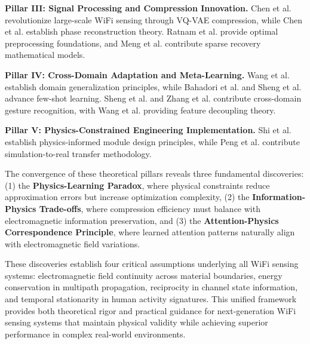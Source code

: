 \documentclass[journal]{IEEEtran}
\begin{document}
\textbf{Pillar III: Signal Processing and Compression Innovation.} Chen et al. \cite{chen2024efficientfi} revolutionize large-scale WiFi sensing through VQ-VAE compression, while Chen et al. \cite{chen2024wiphase} establish phase reconstruction theory. Ratnam et al. \cite{ratnam2024optimal} provide optimal preprocessing foundations, and Meng et al. \cite{meng2021wihgr} contribute sparse recovery mathematical models.

\textbf{Pillar IV: Cross-Domain Adaptation and Meta-Learning.} Wang et al. \cite{wang2022airfi} establish domain generalization principles, while Bahadori et al. \cite{bahadori2022rewis} and Sheng et al. \cite{sheng2024metaformer} advance few-shot learning. Sheng et al. \cite{sheng2024cdfi} and Zhang et al. \cite{zhang2021wifi} contribute cross-domain gesture recognition, with Wang et al. \cite{wang2024feature} providing feature decoupling theory.

\textbf{Pillar V: Physics-Constrained Engineering Implementation.} Shi et al. \cite{shi2023simplified} establish physics-informed module design principles, while Peng et al. \cite{peng2018sim} contribute simulation-to-real transfer methodology.

The convergence of these theoretical pillars reveals three fundamental discoveries: (1) the \textbf{Physics-Learning Paradox}, where physical constraints reduce approximation errors but increase optimization complexity, (2) the \textbf{Information-Physics Trade-offs}, where compression efficiency must balance with electromagnetic information preservation, and (3) the \textbf{Attention-Physics Correspondence Principle}, where learned attention patterns naturally align with electromagnetic field variations.

These discoveries establish four critical assumptions underlying all WiFi sensing systems: electromagnetic field continuity across material boundaries, energy conservation in multipath propagation, reciprocity in channel state information, and temporal stationarity in human activity signatures. This unified framework provides both theoretical rigor and practical guidance for next-generation WiFi sensing systems that maintain physical validity while achieving superior performance in complex real-world environments.
\end{document}
